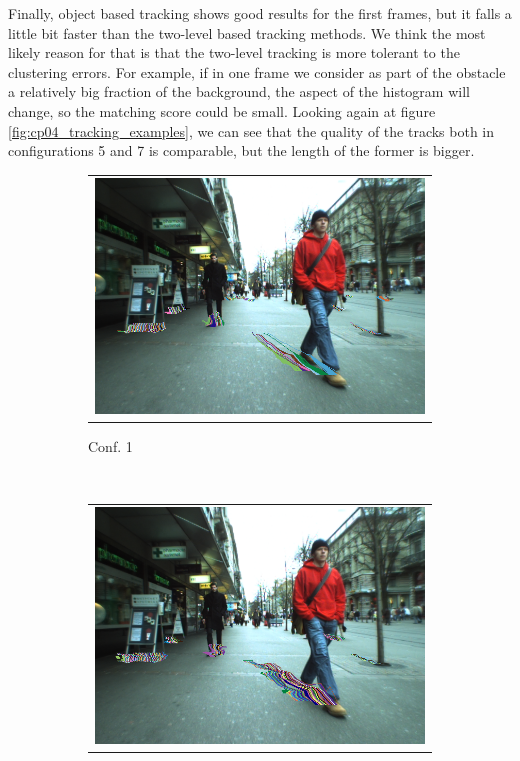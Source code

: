 Finally, object based tracking shows good results for the first frames, but it falls a little bit faster than the two-level based tracking methods. We think the most likely reason for that is that the two-level tracking is more tolerant to the clustering errors. For example, if in one frame we consider as part of the obstacle a relatively big fraction of the background, the aspect of the histogram will change, so the matching score could be small. Looking again at figure \ref{fig:cp04_tracking_examples}, we can see that the quality of the tracks both in configurations 5 and 7 is comparable, but the length of the former is bigger.

\begin{figure}[t]
        \centering
        \begin{subfigure}[b]{0.3\textwidth}
	  \begin{tabular}{c}
	    \includegraphics[width=\textwidth]{trackingConf1}
	  \end{tabular}
	  \caption{Conf. 1}\label{fig:cp04_tracking_example_conf_1}
        \end{subfigure}%
        ~
        \begin{subfigure}[b]{0.3\textwidth}
	  \begin{tabular}{c}
	    \includegraphics[width=\textwidth]{trackingConf5}

\end{tabular}
\end{subfigure}
\end{figure}
